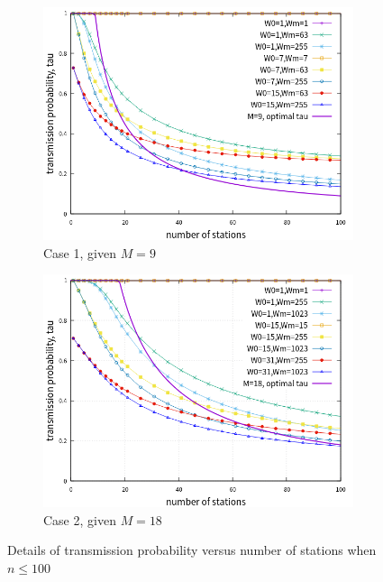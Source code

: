 \documentclass[journal]{IEEEtran}
\begin{document}
\begin{figure}[!t]
\centering
\begin{subfigure}{0.5\textwidth}
\centering
\includegraphics[scale=.54]{./figure/chp4/M9/n_tau_perf_M9_x100.png}
\caption{Case 1, given $M=9$}
\label{fig_tau_n_M9_detail}
\end{subfigure}

\begin{subfigure}{0.5\textwidth}
\centering
\includegraphics[scale=.54]{./figure/chp4/M18/n_tau_perf_M18_x100.png}
\caption{Case 2, given $M=18$}
\label{fig_tau_n_M18_detail}
\end{subfigure}

\caption{Details of transmission probability versus number of stations when $n\leq 100$}
\label{fig_tau_n_detail}
\end{figure}
\end{document}
